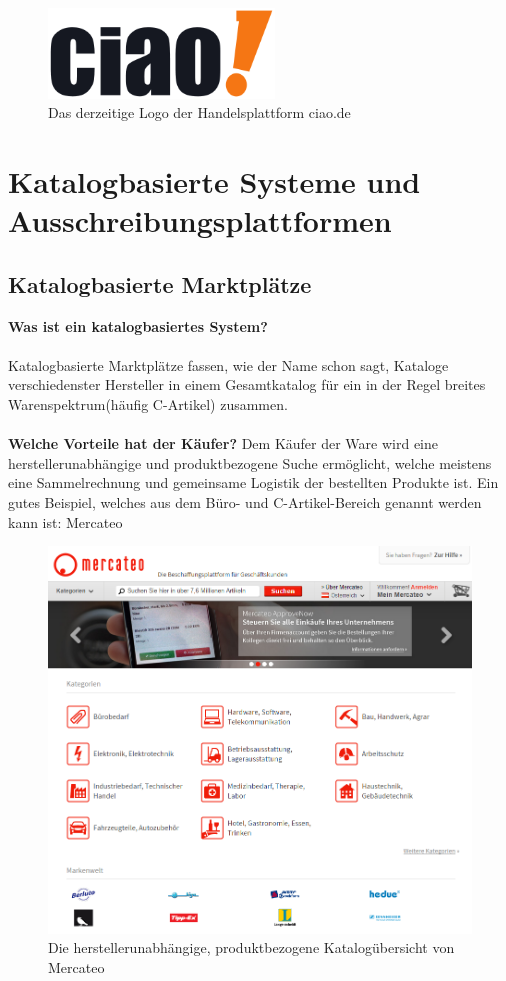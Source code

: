 \documentclass[11pt,a4paper]{article}
\begin{document}
\begin{figure}[ht!]
	\centering
	\includegraphics[width=60mm]{ciao}
	\caption{Das derzeitige Logo der Handelsplattform ciao.de \label{ciao}}
\end{figure}

\newpage
\section{Katalogbasierte Systeme und Ausschreibungsplattformen}

\subsection{Katalogbasierte Marktplätze}
\textbf{Was ist ein katalogbasiertes System?} \\ \\
\noindent Katalogbasierte Marktplätze fassen, wie der Name schon sagt, Kataloge verschiedenster Hersteller in einem Gesamtkatalog für ein in der Regel breites Warenspektrum(häufig C-Artikel) zusammen. \\ \\
\textbf{Welche Vorteile hat der Käufer?}
Dem Käufer der Ware wird eine herstellerunabhängige und produktbezogene Suche ermöglicht, welche meistens eine Sammelrechnung und gemeinsame Logistik der bestellten Produkte ist. Ein gutes Beispiel, welches aus dem Büro- und C-Artikel-Bereich genannt werden kann ist: Mercateo

\begin{figure}[ht!]
	\centering
	\includegraphics[width=180mm]{mercateo}
	\caption{Die herstellerunabhängige, produktbezogene Katalogübersicht von Mercateo \label{mercateo}}
\end{figure}
\end{document}
